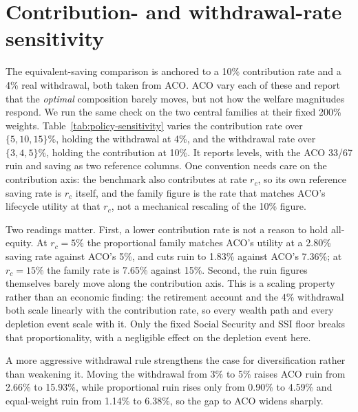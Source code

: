 \documentclass[11pt]{article}
\begin{document}


\section{Contribution- and withdrawal-rate sensitivity}
\label{app:policy-sensitivity}

The equivalent-saving comparison is anchored to a 10\% contribution rate and
a 4\% real withdrawal, both taken from ACO. ACO vary each of these and report
that the \emph{optimal} composition barely moves, but not how the welfare
magnitudes respond. We run the same check on the two central families at their
fixed 200\% weights. Table~\ref{tab:policy-sensitivity} varies the
contribution rate over $\{5, 10, 15\}\%$, holding the withdrawal at 4\%, and
the withdrawal rate over $\{3, 4, 5\}\%$, holding the contribution at 10\%.
It reports levels, with the ACO 33/67 ruin and saving as two reference
columns. One convention needs care on the contribution axis: the benchmark
also contributes at rate $r_c$, so its own reference saving rate is $r_c$
itself, and the family figure is the rate that matches ACO's lifecycle
utility at that $r_c$, not a mechanical rescaling of the 10\% figure.

Two readings matter. First, a lower contribution rate is not a reason to hold
all-equity. At $r_c=5\%$ the proportional family matches ACO's utility at a
2.80\% saving rate against ACO's 5\%, and cuts ruin to 1.83\% against
ACO's 7.36\%; at $r_c=15\%$ the family rate is 7.65\% against 15\%. Second,
the ruin figures themselves barely move along the contribution axis. This is
a scaling property rather than an economic finding: the retirement account
and the 4\% withdrawal both scale linearly with the contribution rate, so
every wealth path and every depletion event scale with it. Only the fixed
Social Security and SSI floor breaks that proportionality, with a negligible
effect on the depletion event here.

A more aggressive withdrawal rule strengthens the case for diversification
rather than weakening it. Moving the withdrawal from 3\% to 5\% raises ACO
ruin from 2.66\% to 15.93\%, while proportional ruin rises only from
0.90\% to 4.59\% and equal-weight ruin from 1.14\% to 6.38\%, so the
gap to ACO widens sharply.
\end{document}
